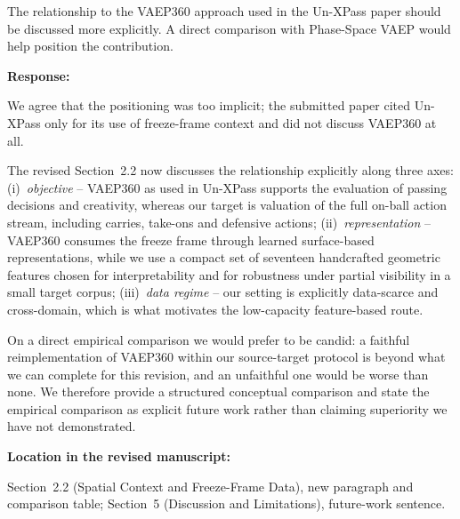 \documentclass[11pt,a4paper]{article}
\newcommand{\response}[2]{%
  \begin{responsebox}
  \textbf{Response:}

  #1
  \end{responsebox}
  \begin{locationbox}
  \textbf{Location in the revised manuscript:}

  #2
  \end{locationbox}
}
\begin{document}
\begin{reviewbox}[Comment 7]
The relationship to the VAEP360 approach used in the Un-XPass paper should be discussed more explicitly. A direct comparison with Phase-Space VAEP would help position the contribution.
\end{reviewbox}
\response{We agree that the positioning was too implicit; the submitted paper cited Un-XPass only for its use of freeze-frame context and did not discuss VAEP360 at all.

The revised Section~2.2 now discusses the relationship explicitly along three axes: (i)~\emph{objective} -- VAEP360 as used in Un-XPass supports the evaluation of passing decisions and creativity, whereas our target is valuation of the full on-ball action stream, including carries, take-ons and defensive actions; (ii)~\emph{representation} -- VAEP360 consumes the freeze frame through learned surface-based representations, while we use a compact set of seventeen handcrafted geometric features chosen for interpretability and for robustness under partial visibility in a small target corpus; (iii)~\emph{data regime} -- our setting is explicitly data-scarce and cross-domain, which is what motivates the low-capacity feature-based route.

On a direct empirical comparison we would prefer to be candid: a faithful reimplementation of VAEP360 within our source-target protocol is beyond what we can complete for this revision, and an unfaithful one would be worse than none. We therefore provide a structured conceptual comparison and state the empirical comparison as explicit future work rather than claiming superiority we have not demonstrated.}{Section~2.2 (Spatial Context and Freeze-Frame Data), new paragraph and comparison table; Section~5 (Discussion and Limitations), future-work sentence.}
\end{document}
